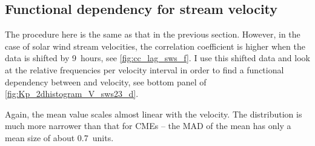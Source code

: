 \subsection{Functional dependency for stream velocity}
The procedure here is the same as that in the previous section. However, in the case of solar wind stream velocities, the correlation coefficient is higher when the data is shifted by 9~hours, see \autoref{fig:cc_lag_sws_f}.
I use this shifted data and look at the relative frequencies per velocity interval in order to find a functional dependency between \Kp{} and velocity, see bottom panel of \autoref{fig:Kp_2dhistogram_V_sws23_d}.
\begin{figure}
\end{figure}
Again, the mean \Kp{} value scales almost linear with the velocity. The distribution is much more narrower than that for CMEs -- the MAD of the mean has only a mean size of about \SI{0.7}{\Kp}~units.

